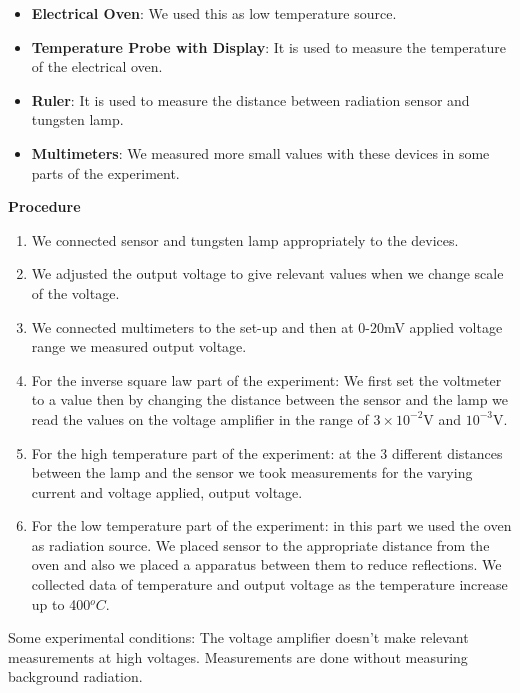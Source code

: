\documentclass[11pt,a4paper]{article}
\begin{document}
{\begin{itemize}
	    \item \textbf{Electrical Oven}: We used this as low temperature source.
	    \item \textbf{Temperature Probe with Display}: It is used to measure the temperature of the electrical oven.
	    \item \textbf{Ruler}: It is used to measure the distance between radiation sensor and tungsten lamp.
	    \item \textbf{Multimeters}: We measured more small values with these devices in some parts of the experiment.
	    \end{itemize}
    \textbf{\small{Procedure}}
    \begin{enumerate}
    	\item We connected sensor and tungsten lamp appropriately to the devices.
    	\item We adjusted the output voltage to give relevant values when we change scale of the voltage.
    	\item We connected multimeters to the set-up and then at 0-20mV applied voltage range we measured output voltage.
    	\item For the inverse square law part of the experiment: We first set the voltmeter to a value then by changing the distance between the sensor and the lamp we read the values on the voltage amplifier in the range of $3\times 10^{-2}$V and $10^{-3}$V.
    	\item For the high temperature part of the experiment: at the 3 different distances between the lamp and the sensor we took measurements for the varying current and voltage applied, output voltage.
    	\item For the low temperature part of the experiment: in this part we used the oven as radiation source. We placed sensor to the appropriate distance from the oven and also we placed a apparatus between them to reduce reflections. We collected data of temperature and output voltage as the temperature increase up to 400$^oC$.
    \end{enumerate}
        Some experimental conditions: The voltage amplifier doesn't make relevant measurements at high voltages. Measurements are done without measuring background radiation.
        \begin{figure}[H]
        	\begin{center}

\end{center}
\end{figure}}
\end{document}
